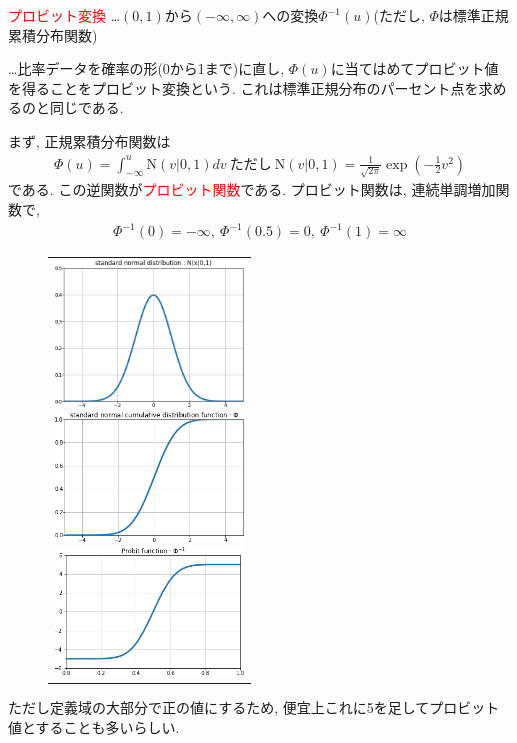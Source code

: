 \documentclass[11pt,a4pape,dvipdfmx]{jarticle}
\newcommand{\eqn}[1]{\begin{align*}#1\end{align*}}
\newcommand{\tcr}[1]{\textcolor{red}{#1}}
\begin{document}
\begin{itembox}[l]{\tcr{プロビット変換}}
…$(0,1)$から$(-\infty,\infty)$への変換$\Phi^{-1}(u)$(ただし, $\Phi$は標準正規累積分布関数)
\end{itembox}

…比率データを確率の形(0から1まで)に直し, $\Phi(u)$に当てはめてプロビット値を得ることをプロビット変換という.
これは標準正規分布のパーセント点を求めるのと同じである.

まず, 正規累積分布関数は
\eqn{\Phi(u)=\int_{-\infty}^u \text{N}(v|0,1)dv\ \text{ただし}\ \text{N}(v|0,1)=\tfrac{1}{\sqrt{2\pi}}\exp\left(-\tfrac{1}{2}v^2\right)}
である.
この逆関数が\tcr{プロビット関数}である.
プロビット関数は, 連続単調増加関数で,
\eqn{\Phi^{-1}(0)=-\infty,\ \Phi^{-1}(0.5)=0,\ \Phi^{-1}(1)=\infty}

\begin{figure}[H]
\begin{center}
\begin{tabular}{c}
\begin{minipage}{0.33\hsize}
\begin{center}
\includegraphics[clip, width=5cm]{../1/code/sn.png}
\end{center}
\end{minipage}
\begin{minipage}{0.33\hsize}
\begin{center}
\includegraphics[clip, width=5cm]{../1/code/sn_cdf.png}
\end{center}
\end{minipage}
\begin{minipage}{0.33\hsize}
\begin{center}
\includegraphics[clip, width=5cm]{../1/code/probit_func.png}
\end{center}
\end{minipage}
\end{tabular}
\end{center}
\end{figure}
ただし定義域の大部分で正の値にするため, 便宜上これに5を足してプロビット値とすることも多いらしい.
\end{document}
